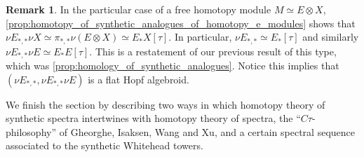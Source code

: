 \documentclass[oneside,a4paper]{amsart}
\theoremstyle{plain}
\theoremstyle{definition}
\newtheorem{rem}[thm]{Remark}
\theoremstyle{remark}
\begin{document}
\begin{rem}
\label{rem:synthetic_e_homology_of_e}
In the particular case of  a free homotopy module $M \simeq E \otimes X$, \cref{prop:homotopy_of_synthetic_analogues_of_homotopy_e_modules} shows that $\nu E_{*, *} \nu X \simeq \pi_{*, *} \nu (E \otimes X) \simeq E_{*}X[\tau]$. In particular, $\nu E_{*, *} \simeq E_{*}[\tau]$ and similarly $\nu E_{*, *} \nu E \simeq E_{*}E[\tau]$. This is a restatement of our previous result of this type, which was \cref{prop:homology_of_synthetic_analogues}. Notice this implies that $(\nu E_{*, *}, \nu E_{*, *} \nu E)$ is a flat Hopf algebroid. 
\end{rem}

We finish the section by describing two ways in which homotopy theory of synthetic spectra intertwines with homotopy theory of spectra, the ``$C\tau$-philosophy'' of Gheorghe, Isaksen, Wang and Xu, and a certain spectral sequence associated to the synthetic Whitehead towers.
\end{document}
